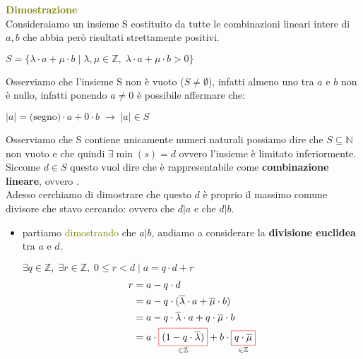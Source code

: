 \begin{boxA}
    \textcolor{olive}{\textbf{Dimostrazione}} \\
    Consideraiamo un insieme S costituito da tutte le combinazioni lineari intere di $a, b$ che abbia però risultati strettamente positivi.
    
    {\centering
        $S = \{\lambda \cdot a + \mu \cdot b \; \vert \; \lambda, \mu \in \mathbb{Z}, \; \lambda \cdot a + \mu \cdot b > 0\}$
    \par}

    Osserviamo che l'insieme S non è vuoto ($S \neq \emptyset$), infatti almeno uno tra $a$ e $b$ non è nullo, infatti ponendo $a \neq 0$ è possibile affermare che:

    {\centering
        $| a | = \text{(segno)} \cdot a + 0 \cdot b \; \rightarrow \; | a | \in S$
    \par}

    Osserviamo che S contiene unicamente numeri naturali possiamo dire che $S \subseteq \mathbb{N}$ non vuoto e che quindi $\exists \min(s) = d$ ovvero l'insieme è limitato inferiormente. Siccome $d \in S$ questo vuol dire che è rappresentabile come \textbf{combinazione lineare}, ovvero . \\
    Adesso cerchiamo di dimostrare che questo $d$ è proprio il massimo comune divisore che stavo cercando:  ovvero che $d|a$ e che $d|b$.
    \begin{itemize}[nosep]
        \item partiamo \textcolor{olive}{dimostrando} che $a|b$, andiamo a considerare la \textbf{divisione euclidea} tra $a$ e $d$.

        {\centering
            $\exists q \in \mathbb{Z}, \; \exists r \in \mathbb{Z}, \; 0 \leq r < d \; \vert \; a = q \cdot d + r$
            \begin{align*}
            r &= a - q \cdot d \\
            &= a - q \cdot (\overline{\lambda} \cdot a + \overline{\mu} \cdot b) \\
            &= a - q \cdot \overline{\lambda} \cdot a + q \cdot \overline{\mu} \cdot b \\
            &= a \cdot \underset{\in \mathbb{Z}}{\fcolorbox{red}{white}{$(1 - q \cdot \overline{\lambda})$}} + b \cdot \underset{\in \mathbb{Z}}{\fcolorbox{red}{white}{$q \cdot \overline{\mu}$}}
            \end{align*}
        \par}


\end{itemize}
\end{boxA}
